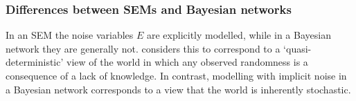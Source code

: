 


\subsubsection{Differences between SEMs and Bayesian networks}

%
%
In an SEM the noise variables $E$ are explicitly modelled, while in a Bayesian network they are generally not.
\cite{pearl2009causality} considers this to correspond to a `quasi-deterministic' view of the world in which any observed randomness is a consequence of a lack of knowledge. 
In contrast, modelling with implicit noise in a Bayesian network corresponds to a view that the world is inherently stochastic.


